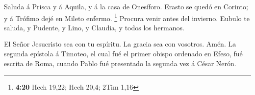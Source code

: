  Saluda á Prisca y á Aquila, y á la casa de Onesíforo.
 Erasto se quedó en Corinto; y á Trófimo dejé en Mileto
enfermo. \footnote{\textbf{4:20} Hech 19,22; Hech 20,4; 2Tim 1,16}
 Procura venir antes del invierno. Eubulo te saluda, y
Pudente, y Lino, y Claudia, y todos los hermanos.

 El Señor Jesucristo sea con tu espíritu. La gracia sea con
vosotros. Amén. La segunda epístola á Timoteo, el cual fué el primer
obispo ordenado en Efeso, fué escrita de Roma, cuando Pablo fué
presentado la segunda vez á César Nerón.
